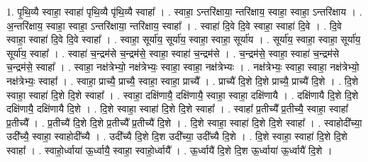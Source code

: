 \documentclass[17pt]{extarticle}
\begin{document}
1. पृ॒थि॒व्यै स्वाहा॒ स्वाहा॑ पृथि॒व्यै पृ॑थि॒व्यै स्वाहा᳚ । . स्वाहा॒ ऽन्तरि॑क्षाया॒ न्तरि॑क्षाय॒ स्वाहा॒ स्वाहा॒ ऽन्तरि॑क्षाय । . अ॒न्तरि॑क्षाय॒ स्वाहा॒ स्वाहा॒ ऽन्तरि॑क्षाया॒ न्तरि॑क्षाय॒ स्वाहा᳚ । . स्वाहा॑ दि॒वे दि॒वे स्वाहा॒ स्वाहा॑ दि॒वे । . दि॒वे स्वाहा॒ स्वाहा॑ दि॒वे दि॒वे स्वाहा᳚ । . स्वाहा॒ सूर्या॑य॒ सूर्या॑य॒ स्वाहा॒ स्वाहा॒ सूर्या॑य । . सूर्या॑य॒ स्वाहा॒ स्वाहा॒ सूर्या॑य॒ सूर्या॑य॒ स्वाहा᳚ । . स्वाहा॑ च॒न्द्रम॑से च॒न्द्रम॑से॒ स्वाहा॒ स्वाहा॑ च॒न्द्रम॑से । . च॒न्द्रम॑से॒ स्वाहा॒ स्वाहा॑ च॒न्द्रम॑से च॒न्द्रम॑से॒ स्वाहा᳚ । . स्वाहा॒ नक्ष॑त्रेभ्यो॒ नक्ष॑त्रेभ्यः॒ स्वाहा॒ स्वाहा॒ नक्ष॑त्रेभ्यः । . नक्ष॑त्रेभ्यः॒ स्वाहा॒ स्वाहा॒ नक्ष॑त्रेभ्यो॒ नक्ष॑त्रेभ्यः॒ स्वाहा᳚ । . स्वाहा॒ प्राच्यै॒ प्राच्यै॒ स्वाहा॒ स्वाहा॒ प्राच्यै᳚ । . प्राच्यै॑ दि॒शे दि॒शे प्राच्यै॒ प्राच्यै॑ दि॒शे । . दि॒शे स्वाहा॒ स्वाहा॑ दि॒शे दि॒शे स्वाहा᳚ । . स्वाहा॒ दक्षि॑णायै॒ दक्षि॑णायै॒ स्वाहा॒ स्वाहा॒ दक्षि॑णायै । . दक्षि॑णायै दि॒शे दि॒शे दक्षि॑णायै॒ दक्षि॑णायै दि॒शे । . दि॒शे स्वाहा॒ स्वाहा॑ दि॒शे दि॒शे स्वाहा᳚ । . स्वाहा᳚ प्र॒तीच्यै᳚ प्र॒तीच्यै॒ स्वाहा॒ स्वाहा᳚ प्र॒तीच्यै᳚ । . प्र॒तीच्यै॑ दि॒शे दि॒शे प्र॒तीच्यै᳚ प्र॒तीच्यै॑ दि॒शे । . दि॒शे स्वाहा॒ स्वाहा॑ दि॒शे दि॒शे स्वाहा᳚ । . स्वाहोदी᳚च्या॒ उदी᳚च्यै॒ स्वाहा॒ स्वाहोदी᳚च्यै । . उदी᳚च्यै दि॒शे दि॒श उदी᳚च्या॒ उदी᳚च्यै दि॒शे । . दि॒शे स्वाहा॒ स्वाहा॑ दि॒शे दि॒शे स्वाहा᳚ । . स्वाहो॒र्ध्वाया॑ ऊ॒र्ध्वायै॒ स्वाहा॒ स्वाहो॒र्ध्वायै᳚ । . ऊ॒र्ध्वायै॑ दि॒शे दि॒श ऊ॒र्ध्वाया॑ ऊ॒र्ध्वायै॑ दि॒शे । \newline
\end{document}
